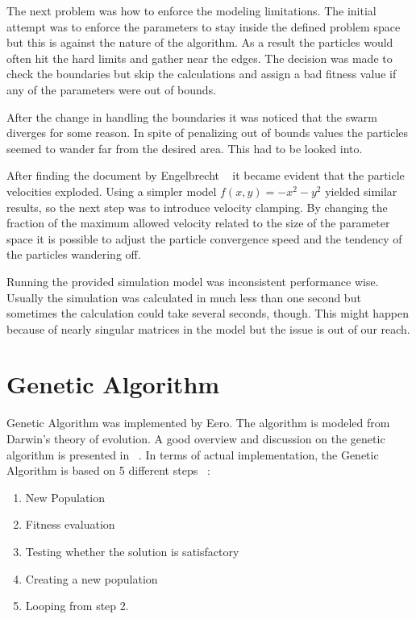 \documentclass[twoside]{article}
\begin{document}
\begin{multicols}{2}
The next problem was how to enforce the modeling limitations. The initial attempt was to enforce the parameters to stay inside the defined problem space but this is against the nature of the algorithm. As a result the particles would often hit the hard limits and gather near the edges. The decision was made to check the boundaries but skip the calculations and assign a bad fitness value if any of the parameters were out of bounds.

After the change in handling the boundaries it was noticed that the swarm diverges for some reason. In spite of penalizing out of bounds values the particles seemed to wander far from the desired area. This had to be looked into.

After finding the document by Engelbrecht ~\cite{pitfalls} it became evident that the particle velocities exploded. Using a simpler model $f(x,y)=-x^2-y^2$ yielded similar results, so the next step was to introduce velocity clamping. By changing the fraction of the maximum allowed velocity related to the size of the parameter space it is possible to adjust the particle convergence speed and the tendency of the particles wandering off.


Running the provided simulation model was inconsistent performance wise. Usually the simulation was calculated in much less than one second but sometimes the calculation could take several seconds, though. This might happen because of nearly singular matrices in the model but the issue is out of our reach.


\section{Genetic Algorithm}

Genetic Algorithm was implemented by Eero. The algorithm is modeled from Darwin’s theory of evolution. A good overview and discussion on the genetic algorithm is presented in ~\cite{mitchell}. In terms of actual implementation, the Genetic Algorithm is based on 5 different steps ~\cite{obitko}:
\begin{enumerate} \itemsep1pt \parskip0pt 
\item New Population
\item Fitness evaluation
\item Testing whether the solution is satisfactory
\item Creating a new population
\item Looping from step 2.
\end{enumerate}


\end{multicols}
\end{document}
